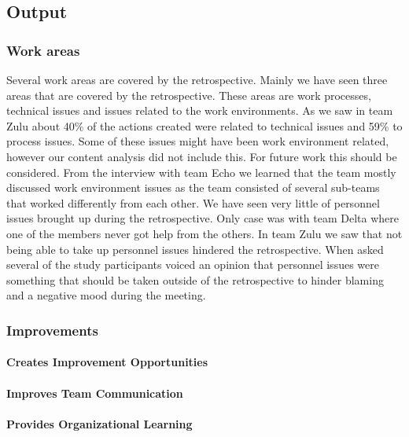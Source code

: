 \subsection{Output}
\subsubsection{Work areas}
Several work areas are covered by the retrospective. Mainly we have seen three areas that are covered by the retrospective. These areas are work processes, technical issues and issues related to the work environments. As we saw in team Zulu about 40\% of the actions created were related to technical issues and 59\% to process issues. Some of these issues might have been work environment related, however our content analysis did not include this. For future work this should be considered. From the interview with team Echo we learned that the team mostly discussed work environment issues as the team consisted of several sub-teams that worked differently from each other. We have seen very little of personnel issues brought up during the retrospective. Only case was with team Delta where one of the members never got help from the others. In team Zulu we saw that not being able to take up personnel issues hindered the retrospective. When asked several of the study participants voiced an opinion that personnel issues were something that should be taken outside of the retrospective to hinder blaming and a negative mood during the meeting. 

\subsubsection{Improvements}
\paragraph{Creates Improvement Opportunities}
\paragraph{Improves Team Communication}




\paragraph{Provides Organizational Learning}

